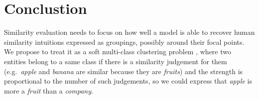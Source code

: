 \documentclass[11pt]{article}
\begin{document}
\section{Conclustion}

Similarity evaluation needs to focus on how well a model is able to recover human similarity intuitions expressed as groupings, possibly around their focal points. We propose to treat it as a soft multi-class clustering problem \cite{White:2015:WSE:2838931.2838932}, where two entities belong to a same class if there is a similarity judgement for them (e.g.~\textit{apple} and \textit{banana} are similar because they are \textit{fruits}) and the strength is proportional to the number of such judgements, so we could express that \textit{apple} is more a \textit{fruit} than a \textit{company}.




\balance
\end{document}

